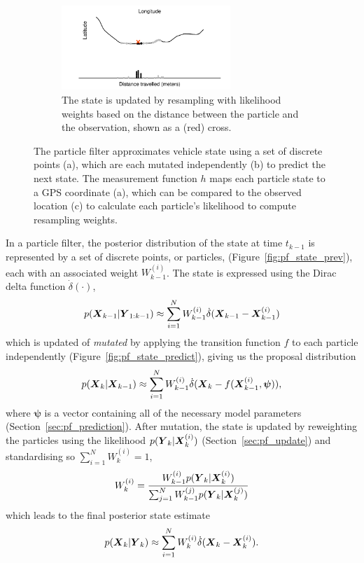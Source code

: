 \begin{figure}[p]
    \begin{subfigure}[t]{0.9\textwidth}
        \centering
        \includegraphics[width=0.7\textwidth]{figures/03_particle_filter_4.pdf}
        \caption{
            The state is updated by resampling with likelihood weights based on the distance
            between the particle and the observation, shown as a (red) cross.
        }
        \label{fig:pf_state_predict2}
    \end{subfigure}
    \caption{
        The particle filter approximates vehicle state using a set of 
        discrete points (a), which are each mutated independently (b)
        to predict the next state.
        The measurement function $h$ maps each particle state
        to a GPS coordinate (a),
        which can be compared to the observed location (c)
        to calculate each particle's likelihood to compute resampling weights.
    }
    \label{fig:pf_state}
\end{figure}

\afterpage{\clearpage}

In a particle filter, the posterior distribution of the state at time $t_{k-1}$
is represented by a set of discrete points, or particles, (Figure~\ref{fig:pf_state_prev}),
each with an associated weight $W_{k-1}^{(i)}$.
The state is expressed using the Dirac delta function $\dot\delta(\cdot)$,
\begin{equation*}
p(\mbox{$\boldsymbol{X}$}_{k-1} | \mbox{$\boldsymbol{Y}$}_{1:k-1}) \approx 
    \sum_{i=1}^N W_{k-1}^{(i)} \dot\delta(\mbox{$\boldsymbol{X}$}_{k-1} - \mbox{$\boldsymbol{X}$}_{k-1}^{(i)})
\end{equation*}
which is updated of \emph{mutated} by applying the transition function $f$
to each particle independently (Figure~\ref{fig:pf_state_predict}),
giving us the proposal distribution
\begin{equation*}
p(\mbox{$\boldsymbol{X}$}_k | \mbox{$\boldsymbol{X}$}_{k-1}) \approx 
    \sum_{i=1}^N W_{k-1}^{(i)} \dot\delta(\mbox{$\boldsymbol{X}$}_{k} - f(\mbox{$\boldsymbol{X}$}_{k-1}^{(i)}, \boldsymbol{\psi})),
\end{equation*}
where $\boldsymbol{\psi}$ is a vector containing all of the necessary model parameters
(Section~\ref{sec:pf_prediction}).
After mutation, 
the state is updated by reweighting the particles using the likelihood $p(\mbox{$\boldsymbol{Y}$}_k | \mbox{$\boldsymbol{X}$}_k^{(i)})$ 
(Section~\ref{sec:pf_update}) and standardising so $\sum_{i=1}^N W_k^{(i)} = 1$,
\begin{equation*}
W_k^{(i)} = \frac{W_{k-1}^{(i)} p(\mbox{$\boldsymbol{Y}$}_k | \mbox{$\boldsymbol{X}$}_k^{(i)})}{
    \sum_{j=1}^N W_{k-1}^{(j)} p(\mbox{$\boldsymbol{Y}$}_k | \mbox{$\boldsymbol{X}$}_k^{(j)})
}
\end{equation*}
which leads to the final posterior state estimate
\begin{equation*}
p(\mbox{$\boldsymbol{X}$}_k | \mbox{$\boldsymbol{Y}$}_k) \approx  
    \sum_{i=1}^N W_{k}^{(i)} \dot\delta(\mbox{$\boldsymbol{X}$}_{k} - \mbox{$\boldsymbol{X}$}_{k}^{(i)}).
\end{equation*}

